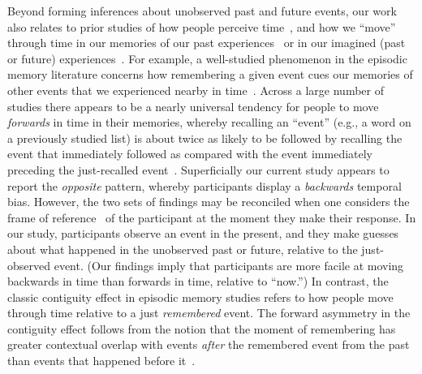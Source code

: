\documentclass[10pt]{article}
\begin{document}
Beyond forming inferences about unobserved past and future events, our work also relates to prior studies of how people perceive time~\citep{BlocGrub14, Howa18, Eagl08, IvrySchl08, Wear16}, and how we ``move'' through time in our memories of our past experiences~\citep{Mann21a, MannEtal11, HowaEtal12, MannEtal07, ShanHowa12, Kaha96, PolyKaha08, SchaTulv94} or in our imagined (past or future) experiences~\citep{Scha12, JossTone20, SchaEtal98, MomeHowa18}. For example, a well-studied phenomenon in the episodic memory literature concerns how remembering a given event cues our memories of other events that we experienced nearby in time~\citep[i.e., the \textit{contiguity effect};][]{Kaha96}. Across a large number of studies there appears to be a nearly universal tendency for people to move \textit{forwards} in time in their memories, whereby recalling an ``event'' (e.g., a word on a previously studied list) is about twice as likely to be followed by recalling the event that immediately followed as compared with the event immediately preceding the just-recalled event~\citep{HealKaha14a}. Superficially our current study appears to report the \textit{opposite} pattern, whereby participants display a \textit{backwards} temporal bias. However, the two sets of findings may be reconciled when one considers the frame of reference~\citep[and current mental context; e.g.,][]{HowaKaha02a} of the participant at the moment they make their response. In our study, participants observe an event in the present, and they make guesses about what happened in the unobserved past or future, relative to the just-observed event. (Our findings imply that participants are more facile at moving backwards in time than forwards in time, relative to ``now.'') In contrast, the classic contiguity effect in episodic memory studies refers to how people move through time relative to a just \textit{remembered} event. The forward asymmetry in the contiguity effect follows from the notion that the moment of remembering has greater contextual overlap with events \textit{after} the remembered event from the past than events that happened before it~\citep[for review also see ][]{MannEtal15, Mann20}.
\end{document}
